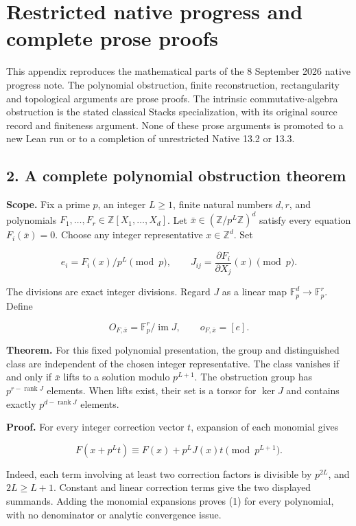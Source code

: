 \clearpage\section{Restricted native progress and complete prose proofs}\label{app:native}
This appendix reproduces the mathematical parts of the 8 September 2026
native progress note. The polynomial obstruction, finite reconstruction,
rectangularity and topological arguments are prose proofs. The intrinsic
commutative-algebra obstruction is the stated classical Stacks specialization,
with its original source record and finiteness argument. None of these prose
arguments is promoted to a new Lean run or to a completion of unrestricted
Native 13.2 or 13.3.
\hypertarget{native:a-complete-polynomial-obstruction-theorem}{%
\subsection{2. A complete polynomial obstruction
theorem}\label{native:a-complete-polynomial-obstruction-theorem}}

\textbf{Scope.} Fix a prime \(p\), an integer \(L\ge1\), finite natural
numbers \(d,r\), and polynomials
\(F_1,\ldots,F_r\in\mathbb Z[X_1,\ldots,X_d]\). Let
\(\bar x\in(\mathbb Z/p^L\mathbb Z)^d\) satisfy every equation
\(F_i(\bar x)=0\). Choose any integer representative
\(x\in\mathbb Z^d\). Set

\[e_i=F_i(x)/p^L\pmod p,\qquad J_{ij}=\frac{\partial F_i}{\partial X_j}(x)\pmod p.\]

The divisions are exact integer divisions. Regard \(J\) as a linear map
\(\mathbb F_p^d\to\mathbb F_p^r\). Define

\[O_{F,\bar x}=\mathbb F_p^r/\operatorname{im}J,\qquad o_{F,\bar x}=[e].\]

\textbf{Theorem.} For this fixed polynomial presentation, the group and
distinguished class are independent of the chosen integer
representative. The class vanishes if and only if \(\bar x\) lifts to a
solution modulo \(p^{L+1}\). The obstruction group has
\(p^{r-\operatorname{rank}J}\) elements. When lifts exist, their set is
a torsor for \(\ker J\) and contains exactly
\(p^{d-\operatorname{rank}J}\) elements.

\textbf{Proof.} For every integer correction vector \(t\), expansion of
each monomial gives

\[F(x+p^Lt)\equiv F(x)+p^LJ(x)t\pmod {p^{L+1}}.\tag{1}\]

Indeed, each term involving at least two correction factors is divisible
by \(p^{2L}\), and \(2L\ge L+1\). Constant and linear correction terms
give the two displayed summands. Adding the monomial expansions proves
(1) for every polynomial, with no denominator or analytic convergence
issue.

